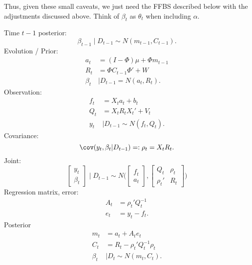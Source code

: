 \documentclass{article}
\begin{document}
Thus, given these small caveats, we just need the FFBS described below with the
adjustments discussed above.  Think of $\beta_t$ as $\theta_t$ when including
$\alpha$.
\begin{outline}
\1 Time $t-1$ posterior:
\[
\beta_{t-1} \mid D_{t-1} \sim N(m_{t-1}, C_{t-1}).
\]
\1 Evolution / Prior:
\begin{align*}
a_t & = (I-\Phi) \mu + \Phi m_{t-1} \\
R_t & = \Phi C_{t-1} \Phi' + W \\
\beta_t & \mid D_{t-1} = N(a_t, R_t).
\end{align*}
\1 Observation:
\begin{align*}
f_t & = X_t a_t + b_t \\
Q_t & = X_t R_t X_t' + V_t \\
y_t & \mid D_{t-1} \sim N(f_t, Q_t).
\end{align*}
\1 Covariance:
\[
\cov(y_t, \beta_t | D_{t-1}) =: \rho_t = X_t R_t.
\]
\1 Joint:
\[
\begin{bmatrix}
y_t \\ \beta_t
\end{bmatrix}
\mid D_{t-1}
\sim
N
\Big(
\begin{bmatrix}
f_t \\ a_t
\end{bmatrix},
\begin{bmatrix}
Q_t & \rho_t \\
\rho_t' & R_t
\end{bmatrix}
\Big)
\]
\1 Regression matrix, error:
\begin{align*}
A_t & = \rho_t' Q_{t}^{-1} \\
e_t & = y_t - f_t.
\end{align*}
\1 Posterior
\begin{align*}
m_t & = a_t + A_t e_t \\
C_t & = R_t - \rho_t' Q_t^{-1} \rho_t \\
\beta_t & \mid D_t \sim N(m_t, C_t).
\end{align*}

\end{outline}
\end{document}
